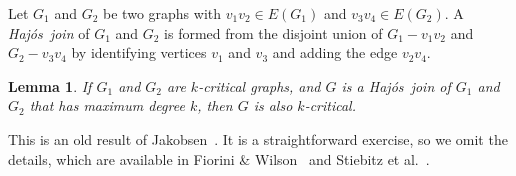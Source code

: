 \documentclass[12pt]{article}
\theoremstyle{plain}
\newtheorem{lem}[prop]{Lemma}
\theoremstyle{definition}
\newtheorem{defn}{Definition}
\theoremstyle{remark}
\def\hajos{Haj\'{o}s}
\begin{document}

%

Let $G_1$ and $G_2$ be two graphs with $v_1v_2\in E(G_1)$ and $v_3v_4\in E(G_2)$.
A \emph{\hajos\ join} of $G_1$ and $G_2$ is formed from the disjoint union of
$G_1-v_1v_2$ and $G_2-v_3v_4$ by identifying vertices $v_1$ and $v_3$ and
adding the edge $v_2v_4$.


\begin{lem}
If $G_1$ and $G_2$ are $k$-critical graphs, and $G$ is a \hajos\ join of $G_1$ and
$G_2$ that has maximum degree $k$, then $G$ is also $k$-critical.
\label{critical}
\end{lem}

This is an old result of Jakobsen~\cite{Jakobsen73}.  It is a
straightforward exercise, so we omit the details,  which are available in
Fiorini \& Wilson~\cite[p. 82--83]{FioriniW77} and Stiebitz et al.~\cite[p.
94]{StiebitzSTF12}.
\end{document}
